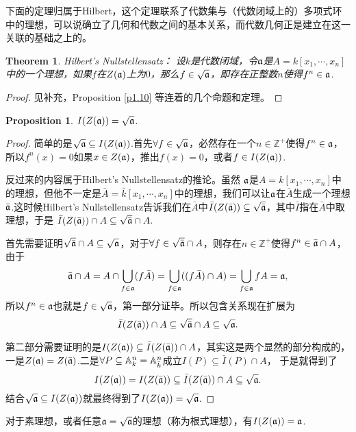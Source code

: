 \documentclass[9pt]{extbook}
\theoremstyle{plain}%
\newtheorem{pro}[defi]{Proposition}%
\newtheorem{theo}[defi]{Theorem}%
\begin{document}
下面的定理归属于Hilbert，这个定理联系了代数集与（代数闭域上的）多项式环中的理想，可以说确立了几何和代数之间的基本关系，而代数几何正是建立在这一关联的基础之上的。
\begin{theo}Hilbert's Nullstellensatz：
设$k$是代数闭域，令$\mathfrak{a}$是$A=k[x_1,\cdots ,x_n]$中的一个理想，如果$f$在$Z(\mathfrak{a})$上为$0$，那么$f\in \sqrt{\mathfrak{a}}$，即存在正整数$n$使得$f^n\in \mathfrak{a}$.
\end{theo}
\begin{proof}
见补充，Proposition \ref{p1.10} 等连着的几个命题和定理。
\end{proof}
\begin{pro}
$I(Z(\mathfrak{a}))=\sqrt{\mathfrak{a}}$. 
\end{pro}
\begin{proof}
简单的是$\sqrt{\mathfrak{a}}\subseteq I(Z(\mathfrak{a}))$.首先$\forall f\in \sqrt{\mathfrak{a}}$，必然存在一个$n\in \mathbb{Z}^+$使得$f^n\in \mathfrak{a}$，所以$f^n(x)=0$如果$x\in Z(\mathfrak{a})$，推出$f(x)=0$，或者$f\in I(Z(\mathfrak{a}))$.

反过来的内容属于Hilbert's Nullstellensatz的推论。虽然
$\mathfrak{a}$是$A=k[x_1,\cdots,x_n]$中的理想，但他不一定是$\bar{A}=\bar{k}[x_1,\cdots,x_n]$中的理想，我们可以让$\mathfrak{a}$在$\bar{A}$生成一个理想$\bar{\mathfrak{a}}$.这时候Hilbert's Nullstellensatz告诉我们在$\bar{A}$中$\bar{I}(Z(\bar{\mathfrak{a}}))\subseteq\sqrt{\bar{\mathfrak{a}}}$，其中$\bar{I}$指在$\bar{A}$中取理想，于是
$
	\bar{I}(Z(\bar{\mathfrak{a}}))\cap A\subseteq\sqrt{\bar{\mathfrak{a}}}\cap A.
$

首先需要证明$\sqrt{\bar{\mathfrak{a}}}\cap A\subseteq \sqrt{\mathfrak{a}}$，对于$\forall f\in \sqrt{\bar{\mathfrak{a}}}\cap A$，则存在$n\in \mathbb{Z}^+$使得$f^n\in \bar{\mathfrak{a}}\cap A$，由于
\[
	\bar{\mathfrak{a}}\cap A=A\cap\bigcup_{f\in\mathfrak{a}}(f\bar{A})=\bigcup_{f\in\mathfrak{a}}((f\bar{A})\cap A)=\bigcup_{f\in\mathfrak{a}}fA=\mathfrak{a},
\]
所以$f^n\in \mathfrak{a}$也就是$f\in \sqrt{\mathfrak{a}}$，第一部分证毕。所以包含关系现在扩展为
\[
	\bar{I}(Z(\bar{\mathfrak{a}}))\cap A\subseteq\sqrt{\bar{\mathfrak{a}}}\cap A\subseteq \sqrt{\mathfrak{a}}.
\]

第二部分需要证明的是$I(Z(\mathfrak{a}))\subseteq \bar{I}(Z(\bar{\mathfrak{a}}))\cap A$，其实这是两个显然的部分构成的，一是$Z(\mathfrak{a})=Z(\bar{\mathfrak{a}})$.二是$\forall P\subseteq \mathbb{A}^n_k=\mathbb{A}^n_{\bar{k}}$成立$I(P)\subseteq \bar{I}(P)\cap A$，
于是就得到了
\[
	I(Z(\mathfrak{a}))=I(Z(\bar{\mathfrak{a}}))\subseteq \bar{I}(Z(\bar{\mathfrak{a}}))\cap A\subseteq \sqrt{\mathfrak{a}}.
\]
结合$\sqrt{\mathfrak{a}}\subseteq I(Z(\mathfrak{a}))$就最终得到了$I(Z(\mathfrak{a}))=\sqrt{\mathfrak{a}}$.
\end{proof}

对于素理想，或者任意$\mathfrak{a}=\sqrt{\mathfrak{a}}$的理想（称为根式理想），有$I(Z(\mathfrak{a}))=\mathfrak{a}$.
\end{document}
